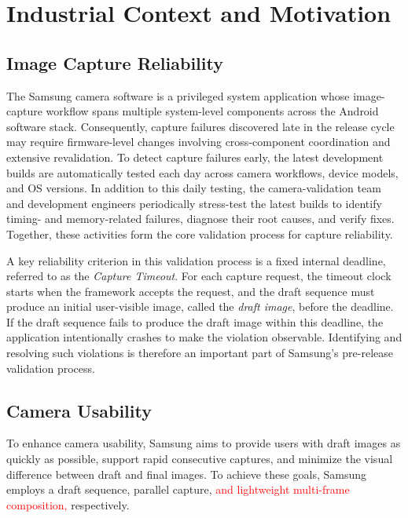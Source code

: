 \section{Industrial Context and Motivation}
\label{sec:background}

\subsection{Image Capture Reliability}
\label{sec:release-process}

The Samsung camera software is a privileged system application whose image-capture workflow spans multiple system-level components across the Android software stack.
Consequently, capture failures discovered late in the release cycle may require firmware-level changes involving cross-component coordination and extensive revalidation.
To detect capture failures early, the latest development builds are automatically tested each day across camera workflows, device models, and OS versions.
In addition to this daily testing, the camera-validation team and development engineers periodically stress-test the latest builds to identify timing- and memory-related failures, diagnose their root causes, and verify fixes.
Together, these activities form the core validation process for capture reliability.

A key reliability criterion in this validation process is a fixed internal deadline, referred to as the \emph{Capture Timeout}.
For each capture request, the timeout clock starts when the framework accepts the request, and the draft sequence must produce an initial user-visible image, called the \emph{draft image}, before the deadline.
If the draft sequence fails to produce the draft image within this deadline, the application intentionally crashes to make the violation observable.
Identifying and resolving such violations is therefore an important part of Samsung's pre-release validation process.



\subsection{Camera Usability}
\label{sec:camera-usability}
\label{sec:draft-background}

To enhance camera usability, Samsung aims to provide users with draft images as quickly as possible, support rapid consecutive captures, and minimize the visual difference between draft and final images.
To achieve these goals, Samsung employs a draft sequence, parallel capture, \textcolor{red}{and lightweight multi-frame composition,} respectively.

